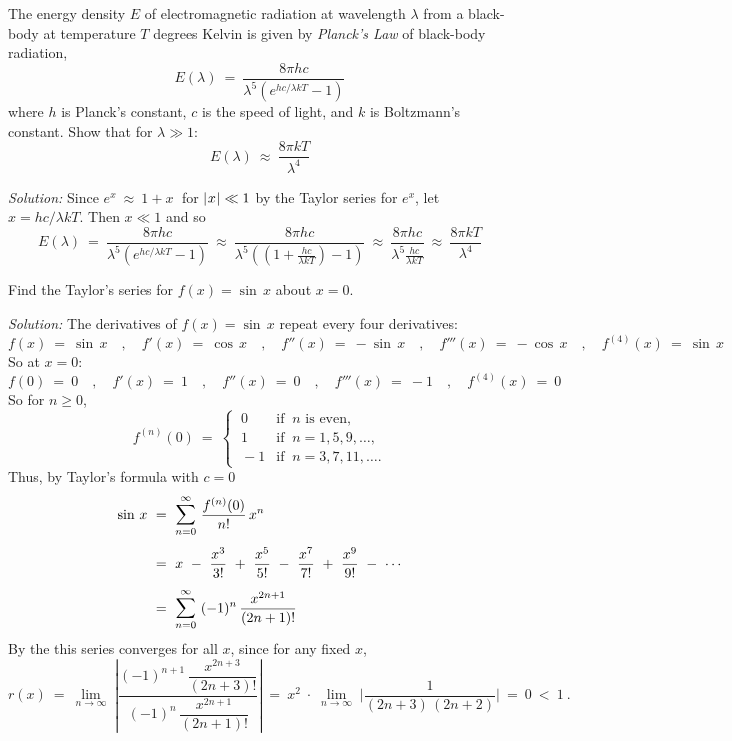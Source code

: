 \begin{exmp}\label{exmp:approxe}
\noindent The energy density $E$ of electromagnetic radiation at wavelength
$\lambda$ from a black-body at temperature $T$ degrees Kelvin is given by
\emph{Planck's Law} of black-body radiation,
\[
 E(\lambda) ~=~ \frac{8\pi h c}{\lambda^5 (e^{hc/\lambda kT} - 1)}
\]
where $h$ is Planck's constant, $c$ is the speed of light, and $k$ is Boltzmann's
constant. Show that for $\lambda \gg 1$:
\[
E(\lambda) ~\approx~ \frac{8\pi kT}{\lambda^4}
\]
\par\noindent\emph{Solution:} Since $e^x ~\approx~ 1 + x\;$ for $\lvert\mspace{1mu}x\mspace{1mu}\rvert \ll 1$
by the Taylor series for $e^x$, let $x = hc/\lambda kT$. Then $x \ll 1$ and so
\[
E(\lambda) ~=~ \frac{8\pi h c}{\lambda^5 (e^{hc/\lambda kT} - 1)} ~\approx~
 \frac{8\pi h c}{\lambda^5 \left(\left(1 + \frac{hc}{\lambda kT}\right) - 1\right)}
~\approx~  \frac{8\pi h c}{\lambda^5 \frac{hc}{\lambda kT}} ~\approx~
\frac{8\pi kT}{\lambda^4}
\]
\end{exmp}
\divider
\newpage
\begin{exmp}\label{exmp:taylorsin}
\noindent Find the Taylor's series for $f(x)=\sin\,x$ about $x=0$.\vspace{1mm}
\par\noindent\emph{Solution:} The derivatives of $f(x)=\sin\,x$ repeat every
four derivatives:
\[
f(x) ~=~ \sin\,x \quad,\quad
f'(x) ~=~ \cos\,x \quad,\quad
f''(x) ~=~ -\sin\,x \quad,\quad
f'''(x) ~=~ -\cos\,x \quad,\quad
f^{(4)}(x) ~=~ \sin\,x
\]
So at $x=0$:
\[
f(0) ~=~ 0 \quad,\quad
f'(x) ~=~ 1 \quad,\quad
f''(x) ~=~ 0 \quad,\quad
f'''(x) ~=~ -1 \quad,\quad
f^{(4)}(x) ~=~ 0
\]
So for $n\ge 0$,
\[
f^{(n)}(0) ~=~ \begin{cases} ~0 & \text{if $~n$ is even,}\\
~1 & \text{if $~n=1,5,9,\ldots$,}\\~-1 & \text{if $~n=3,7,11,\ldots$.}\end{cases}
\]
Thus, by Taylor's formula with $c=0$
\begin{align*}
\sin\,x ~&=~ \bigsum{n=0}{\infty}~ \frac{f^{(n)}(0)}{n !}\,x^n\\[4pt]
&=~ x ~-~ \frac{x^3}{3 !} ~+~ \frac{x^5}{5 !} ~-~ \frac{x^7}{7 !} ~+~
\frac{x^9}{9 !} ~-~ \cdots\\[4pt]
&=~ \bigsum{n=0}{\infty}~ (-1)^{n}\,\frac{x^{2n+1}}{(2n+1) !}
\end{align*}
By the  this series converges for all $x$, since for any fixed $x$,
\[
r(x) ~=~ \lim_{n \to \infty} \;\left|\dfrac{(-1)^{n+1}\,\dfrac{x^{2n+3}}{(2n+3) !}}
{(-1)^{n}\,\dfrac{x^{2n+1}}{(2n+1) !}}\right| ~=~
x^2 \;\cdot\; \lim_{n \to \infty} \;\Biggl|\frac{1}{(2n+3)\,(2n+2)}\Biggr| ~=~ 0 ~<~ 1 ~.
\]
\end{exmp}
